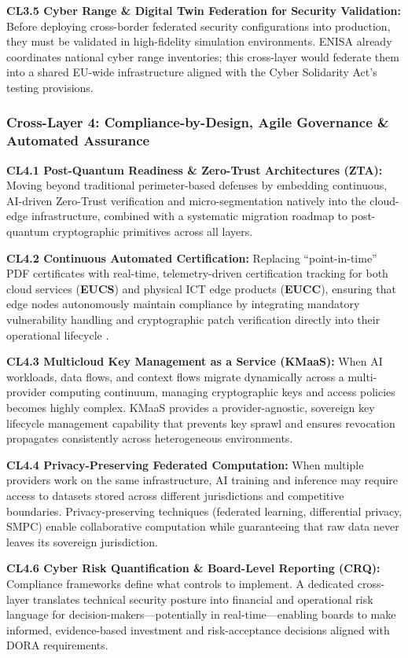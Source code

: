 \documentclass[12pt,a4paper]{report}
\begin{document}
\textbf{CL3.5 Cyber Range \& Digital Twin Federation for Security Validation:} Before deploying cross-border federated security configurations into production, they must be validated in high-fidelity simulation environments. ENISA already coordinates national cyber range inventories; this cross-layer would federate them into a shared EU-wide infrastructure aligned with the Cyber Solidarity Act's testing provisions.

\subsubsection*{Cross-Layer 4: Compliance-by-Design, Agile Governance \& Automated Assurance}
\textbf{CL4.1 Post-Quantum Readiness \& Zero-Trust Architectures (ZTA):} Moving beyond traditional perimeter-based defenses by embedding continuous, AI-driven Zero-Trust verification and micro-segmentation natively into the cloud-edge infrastructure, combined with a systematic migration roadmap to post-quantum cryptographic primitives across all layers.

\textbf{CL4.2 Continuous Automated Certification:} Replacing ``point-in-time'' PDF certificates with real-time, telemetry-driven certification tracking for both cloud services (\textbf{EUCS}) and physical ICT edge products (\textbf{EUCC}), ensuring that edge nodes autonomously maintain compliance by integrating mandatory vulnerability handling and cryptographic patch verification directly into their operational lifecycle \cite{eucc}.

\textbf{CL4.3 Multicloud Key Management as a Service (KMaaS):} When AI workloads, data flows, and context flows migrate dynamically across a multi-provider computing continuum, managing cryptographic keys and access policies becomes highly complex. KMaaS provides a provider-agnostic, sovereign key lifecycle management capability that prevents key sprawl and ensures revocation propagates consistently across heterogeneous environments.

\textbf{CL4.4 Privacy-Preserving Federated Computation:} When multiple providers work on the same infrastructure, AI training and inference may require access to datasets stored across different jurisdictions and competitive boundaries. Privacy-preserving techniques (federated learning, differential privacy, SMPC) enable collaborative computation while guaranteeing that raw data never leaves its sovereign jurisdiction.

\textbf{CL4.6 Cyber Risk Quantification \& Board-Level Reporting (CRQ):} Compliance frameworks define what controls to implement. A dedicated cross-layer translates technical security posture into financial and operational risk language for decision-makers---potentially in real-time---enabling boards to make informed, evidence-based investment and risk-acceptance decisions aligned with DORA requirements.
\end{document}
